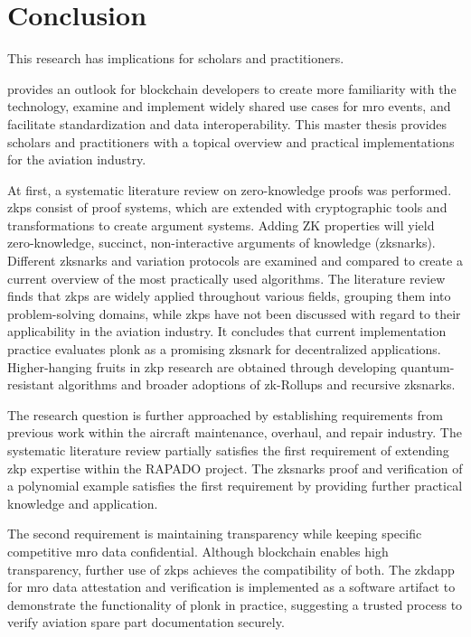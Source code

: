 \chapter{Conclusion}
This research has implications for scholars and practitioners. 

\citet{efthymiou} provides an outlook for blockchain developers to create more familiarity with the technology, examine and implement widely shared use cases for \acrshort{mro} events, and facilitate standardization and data interoperability. This master thesis provides scholars and practitioners with a topical overview and practical implementations for the aviation industry.

At first, a systematic literature review on zero-knowledge proofs was performed. \acrshort{zkp}s consist of proof systems, which are extended with cryptographic tools and transformations to create argument systems. Adding ZK properties will yield zero-knowledge, succinct, non-interactive arguments of knowledge (\acrshort{zksnark}s). Different \acrshort{zksnark}s and variation protocols are examined and compared to create a current overview of the most practically used algorithms. The literature review finds that \acrshort{zkp}s are widely applied throughout various fields, grouping them into problem-solving domains, while \acrshort{zkp}s have not been discussed with regard to their applicability in the aviation industry. It concludes that current implementation practice evaluates \acrshort{plonk} as a promising \acrshort{zksnark} for decentralized applications. Higher-hanging fruits in \acrshort{zkp} research are obtained through developing quantum-resistant algorithms and broader adoptions of zk-Rollups and recursive \acrshort{zksnark}s.

The research question is further approached by establishing requirements from previous work within the aircraft maintenance, overhaul, and repair industry. The systematic literature review partially satisfies the first requirement of extending \acrshort{zkp} expertise within the RAPADO project. The \acrshort{zksnark}s proof and verification of a polynomial example satisfies the first requirement by providing further practical knowledge and application. 

The second requirement is maintaining transparency while keeping specific competitive \acrshort{mro} data confidential. Although blockchain enables high transparency, further use of \acrshort{zkp}s achieves the compatibility of both. The \acrshort{zkdapp} for \acrshort{mro} data attestation and verification is implemented as a software artifact to demonstrate the functionality of \acrshort{plonk} in practice, suggesting a trusted process to verify aviation spare part documentation securely. 

